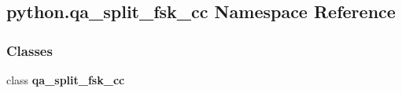 \subsection{python.\+qa\+\_\+split\+\_\+fsk\+\_\+cc Namespace Reference}
\label{namespacepython_1_1qa__split__fsk__cc}
\subsubsection*{Classes}
\begin{DoxyCompactItemize}
\item 
class {\bf qa\+\_\+split\+\_\+fsk\+\_\+cc}
\end{DoxyCompactItemize}
